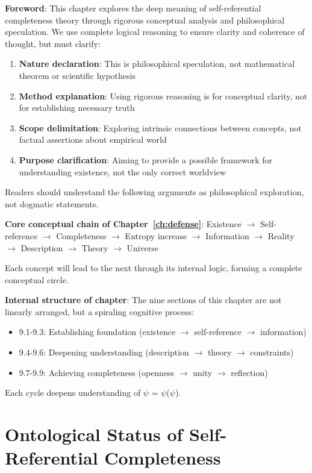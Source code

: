 
\textbf{Foreword}: This chapter explores the deep meaning of self-referential completeness theory through rigorous conceptual analysis and philosophical speculation. We use complete logical reasoning to ensure clarity and coherence of thought, but must clarify:

\begin{enumerate}
\item \textbf{Nature declaration}: This is philosophical speculation, not mathematical theorem or scientific hypothesis
\item \textbf{Method explanation}: Using rigorous reasoning is for conceptual clarity, not for establishing necessary truth
\item \textbf{Scope delimitation}: Exploring intrinsic connections between concepts, not factual assertions about empirical world
\item \textbf{Purpose clarification}: Aiming to provide a possible framework for understanding existence, not the only correct worldview
\end{enumerate}

Readers should understand the following arguments as philosophical exploration, not dogmatic statements.

\textbf{Core conceptual chain of Chapter~\ref{ch:defense}}:
Existence $\rightarrow$ Self-reference $\rightarrow$ Completeness $\rightarrow$ Entropy increase $\rightarrow$ Information $\rightarrow$ Reality $\rightarrow$ Description $\rightarrow$ Theory $\rightarrow$ Universe

Each concept will lead to the next through its internal logic, forming a complete conceptual circle.

\textbf{Internal structure of chapter}:
The nine sections of this chapter are not linearly arranged, but a spiraling cognitive process:
\begin{itemize}
\item 9.1-9.3: Establishing foundation (existence $\rightarrow$ self-reference $\rightarrow$ information)
\item 9.4-9.6: Deepening understanding (description $\rightarrow$ theory $\rightarrow$ constraints)
\item 9.7-9.9: Achieving completeness (openness $\rightarrow$ unity $\rightarrow$ reflection)
\end{itemize}

Each cycle deepens understanding of $\psi$ = $\psi$($\psi$).

\section{Ontological Status of Self-Referential Completeness}
\label{sec:ch11_philosophy:ontological-status-of-self-referential-completeness}

